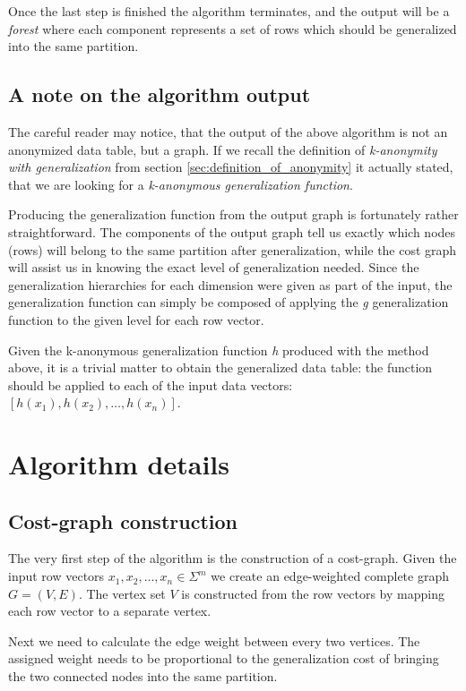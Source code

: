 Once the last step is finished the algorithm terminates, and the output will be a \textit{forest} where each component represents a set of rows which should be generalized into the same partition.

\subsection{A note on the algorithm output}

The careful reader may notice, that the output of the above algorithm is not an anonymized data table, but a graph. If we recall the definition of \textit{k-anonymity with generalization} from section \ref{sec:definition_of_anonymity} it actually stated, that we are looking for a \textit{k-anonymous generalization function}.

Producing the generalization function from the output graph is fortunately rather straightforward. The components of the output graph tell us exactly which nodes (rows) will belong to the same partition after generalization, while the cost graph will assist us in knowing the exact level of generalization needed. Since the generalization hierarchies for each dimension were given as part of the input, the generalization function can simply be composed of applying the \textit{g} generalization function to the given level for each row vector.

Given the k-anonymous generalization function \textit{h} produced with the method above, it is a trivial matter to obtain the generalized data table: the function should be applied to each of the input data vectors: \([h(x_1), h(x_2), \dots, h(x_n)]\).

\section{Algorithm details}

\subsection{Cost-graph construction}

The very first step of the algorithm is the construction of a cost-graph. Given the input row vectors \(x_1, x_2, \dots, x_n \in \Sigma^m\) we create an edge-weighted complete graph \(G = (V,E)\). \cite{aggarwal} The vertex set \(V\) is constructed from the row vectors by mapping each row vector to a separate vertex.

Next we need to calculate the edge weight between every two vertices. The assigned weight needs to be proportional to the generalization cost of bringing the two connected nodes into the same partition.


